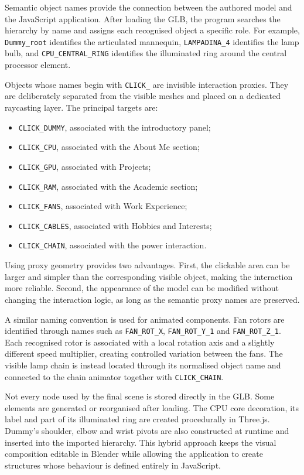 \documentclass{report}
\begin{document}
Semantic object names provide the connection between the authored model
and the JavaScript application. After loading the GLB, the program
searches the hierarchy by name and assigns each recognised object a
specific role. For example, \texttt{Dummy\_root} identifies the
articulated mannequin, \texttt{LAMPADINA\_4} identifies the lamp bulb,
and \texttt{CPU\_CENTRAL\_RING} identifies the illuminated ring around
the central processor element.

Objects whose names begin with \texttt{CLICK\_} are invisible
interaction proxies. They are deliberately separated from the visible
meshes and placed on a dedicated raycasting layer. The principal targets
are:

\begin{itemize}
    \item \texttt{CLICK\_DUMMY}, associated with the introductory panel;
    \item \texttt{CLICK\_CPU}, associated with the About Me section;
    \item \texttt{CLICK\_GPU}, associated with Projects;
    \item \texttt{CLICK\_RAM}, associated with the Academic section;
    \item \texttt{CLICK\_FANS}, associated with Work Experience;
    \item \texttt{CLICK\_CABLES}, associated with Hobbies and Interests;
    \item \texttt{CLICK\_CHAIN}, associated with the power interaction.
\end{itemize}

Using proxy geometry provides two advantages. First, the clickable area
can be larger and simpler than the corresponding visible object, making
the interaction more reliable. Second, the appearance of the model can
be modified without changing the interaction logic, as long as the
semantic proxy names are preserved.

A similar naming convention is used for animated components. Fan rotors
are identified through names such as \texttt{FAN\_ROT\_X},
\texttt{FAN\_ROT\_Y\_1} and \texttt{FAN\_ROT\_Z\_1}. Each recognised
rotor is associated with a local rotation axis and a slightly different
speed multiplier, creating controlled variation between the fans. The
visible lamp chain is instead located through its normalised object name
and connected to the chain animator together with
\texttt{CLICK\_CHAIN}.

Not every node used by the final scene is stored directly in the GLB.
Some elements are generated or reorganised after loading. The CPU core
decoration, its label and part of its illuminated ring are created
procedurally in Three.js. Dummy's shoulder, elbow and wrist pivots are
also constructed at runtime and inserted into the imported hierarchy.
This hybrid approach keeps the visual composition editable in Blender
while allowing the application to create structures whose behaviour is
defined entirely in JavaScript.
\end{document}
